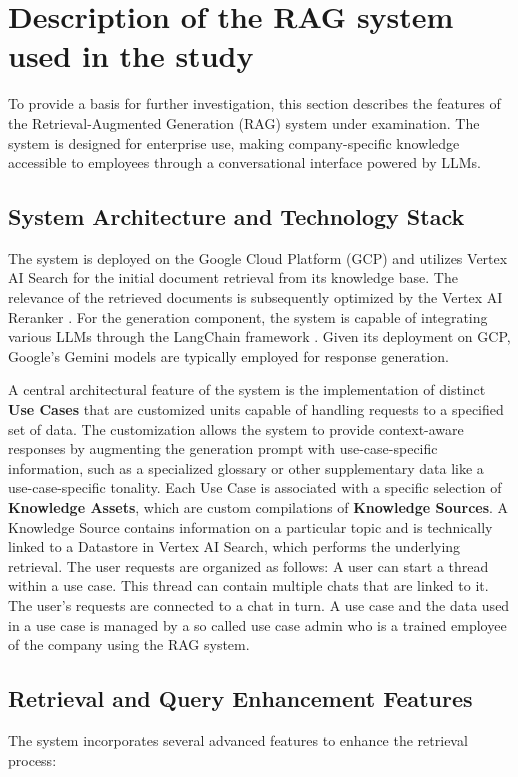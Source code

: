 \documentclass[
	english,
	ruledheaders=section,%
	class=report,%
	thesis={type=bachelor},%
	accentcolor=1b,%
	custommargins=true,%
	marginpar=false,%
	parskip=half-,%
	fontsize=11pt,%
	DIV=14,
]{tudapub}
\begin{document}
\section{Description of the RAG system used in the study}
To provide a basis for further investigation, this section describes the features of the Retrieval-Augmented Generation (RAG) system under examination. The system is designed for enterprise use, making company-specific knowledge accessible to employees through a conversational interface powered by LLMs.

\subsection{System Architecture and Technology Stack}
The system is deployed on the Google Cloud Platform (GCP) \parencite{GoogleCloudDocumentation} and utilizes Vertex AI Search \parencite{GoogleVertexAISearch} for the initial document retrieval from its knowledge base. The relevance of the retrieved documents is subsequently optimized by the Vertex AI Reranker \parencite{GoogleReranker}. For the generation component, the system is capable of integrating various LLMs through the LangChain framework \parencite{LangChain}. Given its deployment on GCP, Google's Gemini models \parencite{GoogleGemini} are typically employed for response generation.

A central architectural feature of the system is the implementation of distinct \textbf{Use Cases} that are customized units capable of handling requests to a specified set of data. The customization allows the system to provide context-aware responses by augmenting the generation prompt with use-case-specific information, such as a specialized glossary or other supplementary data like a use-case-specific tonality. Each Use Case is associated with a specific selection of \textbf{Knowledge Assets}, which are custom compilations of \textbf{Knowledge Sources}. A Knowledge Source contains information on a particular topic and is technically linked to a Datastore in Vertex AI Search, which performs the underlying retrieval. The user requests are organized as follows: A user can start a thread within a use case. This thread can contain multiple chats that are linked to it. The user's requests are connected to a chat in turn. A use case and the data used in a use case is managed by a so called use case admin who is a trained employee of the company using the RAG system.

\subsection{Retrieval and Query Enhancement Features}
The system incorporates several advanced features to enhance the retrieval process:
\end{document}
